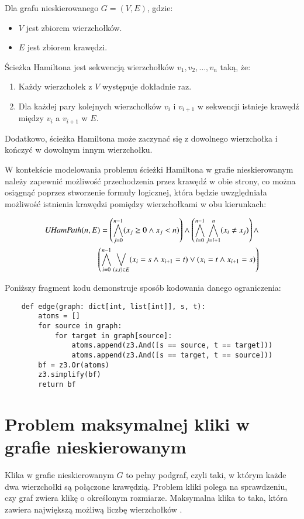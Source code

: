 Dla grafu nieskierowanego $G = (V, E)$, gdzie:
\begin{itemize}
	\item \(V\) jest zbiorem wierzchołków.
	\item \(E\) jest zbiorem krawędzi.
\end{itemize}
Ścieżka Hamiltona jest sekwencją wierzchołków $v_1, v_2, …, v_n$ taką, że:
\begin{enumerate}
	\item Każdy wierzchołek z \(V\) występuje dokładnie raz.
	\item Dla każdej pary kolejnych wierzchołków \(v_i\) i \(v_{i+1}\) w sekwencji istnieje krawędź między \(v_i\) a \(v_{i+1}\) w \(E\). 
\end{enumerate}

Dodatkowo, ścieżka Hamiltona może zaczynać się z dowolnego wierzchołka i kończyć w dowolnym innym wierzchołku.

W kontekście modelowania problemu ścieżki Hamiltona w grafie nieskierowanym należy zapewnić możliwość przechodzenia przez krawędź w obie strony, co można osiągnąć poprzez stworzenie formuły logicznej, która będzie uwzględniała możliwość istnienia krawędzi pomiędzy wierzchołkami w obu kierunkach:

\begin{align*}
	{\mathit{UHamPath}}(n, E) = \left( \bigwedge_{j=0}^{n-1} (x_j \geq 0 \land x_j < n) \right) \land 
	\left( \bigwedge_{i=0}^{n-1} \bigwedge_{j=i+1}^{n} (x_i \neq x_j) \right) \land \\
	\left( \bigwedge_{i=0}^{n-1} \bigvee_{(s,t) \in E} (x_i = s \land x_{i+1} = t) \lor (x_i = t \land x_{i+1} = s) \right)
\end{align*}

Poniższy fragment kodu demonstruje sposób kodowania danego ograniczenia:

\begin{lstlisting}
	def edge(graph: dict[int, list[int]], s, t):
		atoms = []
		for source in graph:
			for target in graph[source]:
				atoms.append(z3.And([s == source, t == target])) 
				atoms.append(z3.And([s == target, t == source]))
		bf = z3.Or(atoms)
		z3.simplify(bf)
		return bf
\end{lstlisting}


\section{Problem maksymalnej kliki w grafie nieskierowanym}

Klika w grafie nieskierowanym \(G\) to pełny podgraf, czyli taki, w którym każde dwa wierzchołki są połączone krawędzią. Problem kliki polega na sprawdzeniu, czy graf zwiera klikę o określonym rozmiarze. Maksymalna klika to taka, która zawiera największą możliwą liczbę wierzchołków \cite{Sipser0086373}. 

